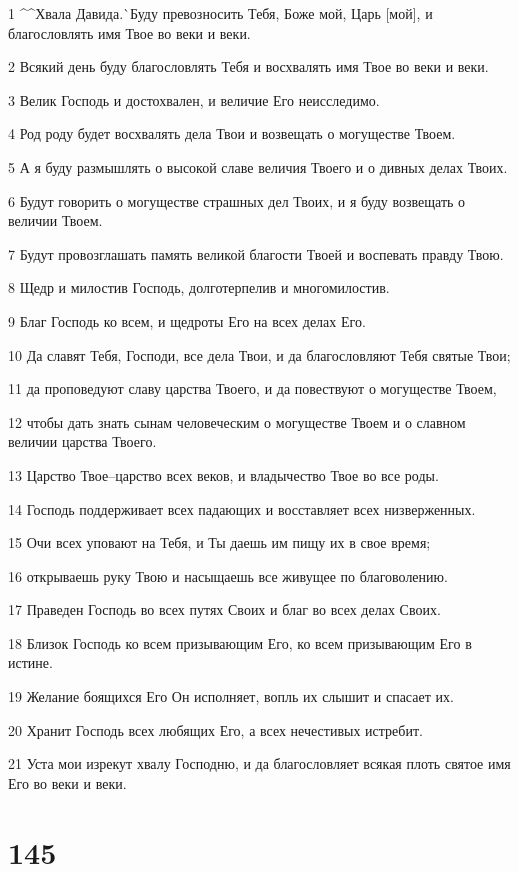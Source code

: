 \par 1 ^^Хвала Давида.^^ Буду превозносить Тебя, Боже мой, Царь [мой], и благословлять имя Твое во веки и веки.
\par 2 Всякий день буду благословлять Тебя и восхвалять имя Твое во веки и веки.
\par 3 Велик Господь и достохвален, и величие Его неисследимо.
\par 4 Род роду будет восхвалять дела Твои и возвещать о могуществе Твоем.
\par 5 А я буду размышлять о высокой славе величия Твоего и о дивных делах Твоих.
\par 6 Будут говорить о могуществе страшных дел Твоих, и я буду возвещать о величии Твоем.
\par 7 Будут провозглашать память великой благости Твоей и воспевать правду Твою.
\par 8 Щедр и милостив Господь, долготерпелив и многомилостив.
\par 9 Благ Господь ко всем, и щедроты Его на всех делах Его.
\par 10 Да славят Тебя, Господи, все дела Твои, и да благословляют Тебя святые Твои;
\par 11 да проповедуют славу царства Твоего, и да повествуют о могуществе Твоем,
\par 12 чтобы дать знать сынам человеческим о могуществе Твоем и о славном величии царства Твоего.
\par 13 Царство Твое--царство всех веков, и владычество Твое во все роды.
\par 14 Господь поддерживает всех падающих и восставляет всех низверженных.
\par 15 Очи всех уповают на Тебя, и Ты даешь им пищу их в свое время;
\par 16 открываешь руку Твою и насыщаешь все живущее по благоволению.
\par 17 Праведен Господь во всех путях Своих и благ во всех делах Своих.
\par 18 Близок Господь ко всем призывающим Его, ко всем призывающим Его в истине.
\par 19 Желание боящихся Его Он исполняет, вопль их слышит и спасает их.
\par 20 Хранит Господь всех любящих Его, а всех нечестивых истребит.
\par 21 Уста мои изрекут хвалу Господню, и да благословляет всякая плоть святое имя Его во веки и веки.

\chapter{145}

